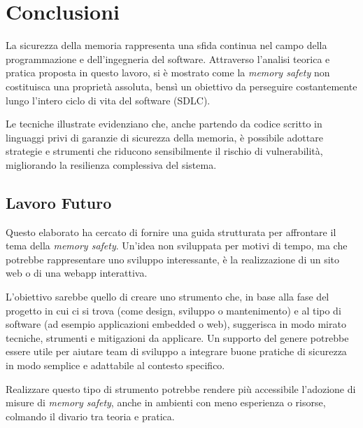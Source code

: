 \chapter{Conclusioni}
\label{cha:conclusioni}

La sicurezza della memoria rappresenta una sfida continua nel campo della
programmazione e dell'ingegneria del software. Attraverso l'analisi teorica e pratica
proposta in questo lavoro, si è mostrato come la \textit{memory safety} non costituisca
una proprietà assoluta, bensì un obiettivo da perseguire costantemente lungo l'intero
ciclo di vita del software (SDLC).

Le tecniche illustrate evidenziano che, anche partendo da codice scritto in linguaggi
privi di garanzie di sicurezza della memoria, è possibile adottare strategie e
strumenti che riducono sensibilmente il rischio di vulnerabilità, migliorando la
resilienza complessiva del sistema.

\section{Lavoro Futuro}
\label{sec:lavoro_futuro}

Questo elaborato ha cercato di fornire una guida strutturata per affrontare il
tema della \textit{memory safety}. Un'idea non sviluppata per motivi di tempo, ma
che potrebbe rappresentare uno sviluppo interessante, è la realizzazione di un
sito web o di una webapp interattiva.

L'obiettivo sarebbe quello di creare uno strumento che, in base alla fase del progetto
in cui ci si trova (come design, sviluppo o mantenimento) e al tipo di software
(ad esempio applicazioni embedded o web), suggerisca in modo mirato tecniche,
strumenti e mitigazioni da applicare. Un supporto del genere potrebbe essere utile
per aiutare team di sviluppo a integrare buone pratiche di sicurezza in modo semplice
e adattabile al contesto specifico.

Realizzare questo tipo di strumento potrebbe rendere più accessibile l'adozione di
misure di \textit{memory safety}, anche in ambienti con meno esperienza o risorse,
colmando il divario tra teoria e pratica.